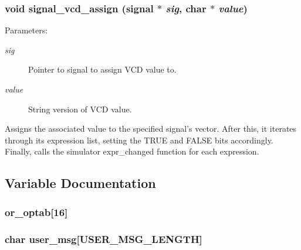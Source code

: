 \subsubsection{\setlength{\rightskip}{0pt plus 5cm}void signal\_\-vcd\_\-assign ({\bf signal} $\ast$ {\em sig}, char $\ast$ {\em value})}\label{signal_8c_a7}


\begin{Desc}
\item[Parameters: ]\par
\begin{description}
\item[{\em 
sig}]Pointer to signal to assign VCD value to. \item[{\em 
value}]String version of VCD value.\end{description}
\end{Desc}
Assigns the associated value to the specified signal's vector. After this, it iterates through its expression list, setting the TRUE and FALSE bits accordingly. Finally, calls the simulator expr\_\-changed function for each expression. 

\subsection{Variable Documentation}
\subsubsection{ or\_\-optab[16]}\label{signal_8c_a0}


\subsubsection{\setlength{\rightskip}{0pt plus 5cm}char user\_\-msg[USER\_\-MSG\_\-LENGTH]}\label{signal_8c_a1}


